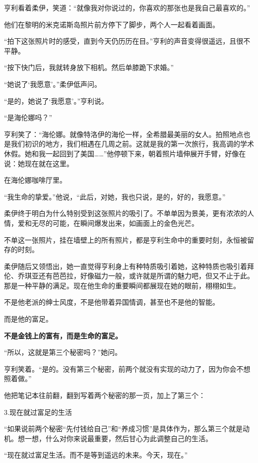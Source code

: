 亨利看着柔伊，笑道：“就像我对你说过的，你喜欢的那张也是我自己最喜欢的。”

他们在黎明的米克诺斯岛照片前方停下了脚步，两个人一起看着画面。

“拍下这张照片时的感受，直到今天仍历历在目。”亨利的声音变得很遥远，且很不平静。

“按下快门后，我就转身放下相机。然后单膝跪下求婚。”

“她说了‘我愿意’。”柔伊低声问。

“是的，她说了‘我愿意’。”亨利说。

“是海伦娜吗？”

亨利笑了：“海伦娜。就像特洛伊的海伦一样，全希腊最美丽的女人。拍照地点也是我们初识的地方，我们相遇在几周之前。这就是我的第一次旅行，我高调的学术休假。她和我一起回到了美国……”他停顿下来，朝着照片墙伸展开手臂，好像在说：她现在就在这里。

在海伦娜咖啡厅里。

“我生命的挚爱。”他说，“此后，对她，我也只说，是的，好的，我愿意。”

柔伊终于明白为什么特别受到这张照片的吸引了。不单单因为景美，更有浓浓的人情，爱和无尽的可能，在瞬间爆发出来，如画面上的金色光芒。

不单这一张照片，挂在墙壁上的所有照片，都是亨利生命中的重要时刻，永恒被留存的时刻。

柔伊随后又领悟出，她一直觉得亨利身上有种特质吸引着她，这种特质也吸引着拜伦、乔琪亚还有芭芭拉，好像磁力一般，或许就是所谓的魅力吧，但又不止于此。那是一种平静的满足。现在他生命的重要瞬间都展现在她的眼前，栩栩如生。

不是他老派的绅士风度，不是他带着异国情调，甚至也不是他的智能。

而是他的富足。

\textbf{不是金钱上的富有，而是生命的富足。}

“所以，这就是第三个秘密吗？”她问。

亨利笑着。“是的。没有第三个秘密，前两个就没有实现的动力了，因为你会不想照着做。”

他把笔记本往前翻，翻到写着两个秘密的那一页，加上了第三个：

{\kaishu 3.现在就过富足的生活}

“如果说前两个秘密“先付钱给自己”和“养成习惯”是具体作为，那么第三个就是动机。想一想，什么对你来说最重要，然后甘心为此调整自己的生活。

“现在就过富足生活。而不是等到遥远的未来。今天，现在。”

